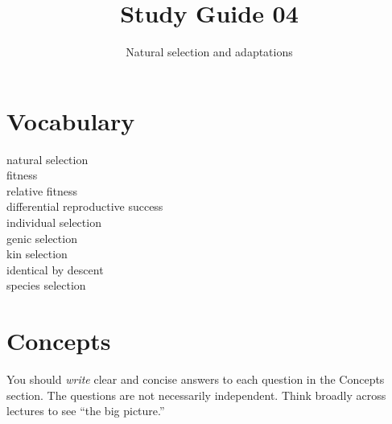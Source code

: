 \documentclass[letterpaper]{tufte-handout}
\title{Study Guide 04\hfill}
\author{Natural selection and adaptations}
\date{} %
\begin{document}
\maketitle	%


\section{Vocabulary} 
\vspace{-1\baselineskip}
\begin{multicols}{2}
natural selection\\
fitness\\
relative fitness\\
differential reproductive success\\
individual selection \\
genic selection \\
kin selection \\
identical by descent \\
species selection \\
\end{multicols}

\section{Concepts}

You should \emph{write} clear and concise answers to each question in the Concepts section.  The questions are not necessarily independent.  Think broadly across lectures to see “the big picture.”
\end{document}
